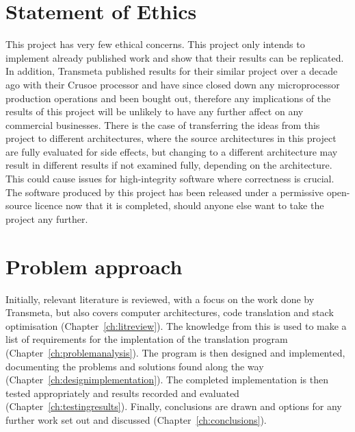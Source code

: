 \section{Statement of Ethics}
This project has very few ethical concerns. This project only intends to
implement already published work and show that their results can be replicated.
In addition, Transmeta published results for their similar project over a decade
ago with their Crusoe processor and have since closed down any microprocessor
production operations and been bought out, therefore any implications of the
results of this project will be unlikely to have any further affect on any
commercial businesses. There is the case of transferring the ideas from this
project to different architectures, where the source architectures in this
project are fully evaluated for side effects, but changing to a different
architecture may result in different results if not examined fully, depending on
the architecture. This could cause issues for high-integrity software where
correctness is crucial. The software produced by this project has been released
under a permissive open-source licence now that it is completed, should anyone
else want to take the project any further.

\section{Problem approach}
Initially, relevant literature is reviewed, with a focus on the work done by
Transmeta, but also covers computer architectures, code translation and stack
optimisation (Chapter~\ref{ch:litreview}). The knowledge from this is used to
make a list of requirements for the implentation of the translation program
(Chapter~\ref{ch:problemanalysis}). The program is then designed and
implemented, documenting the problems and solutions found along the way
(Chapter~\ref{ch:designimplementation}). The completed implementation is then
tested appropriately and results recorded and evaluated
(Chapter~\ref{ch:testingresults}). Finally, conclusions are drawn and options
for any further work set out and discussed (Chapter~\ref{ch:conclusions}).
